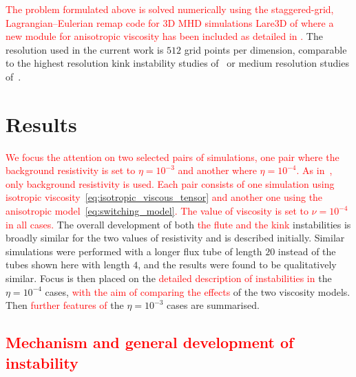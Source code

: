 \documentclass[12pt]{article}
\newcommand{\rs}[2]{\textcolor{red}{#2}}
\begin{document}
\rs{}{The problem formulated above is solved numerically using the
  staggered-grid, Lagrangian–Eulerian remap code for 3D MHD
  simulations Lare3D of \cite{arberStaggeredGridLagrangian2001} where
  a  new module for anisotropic viscosity has been
  included as detailed in \cite{quinnKelvinHelmholtzInstabilityCollapse2021}.} The resolution used in the
current work is  $512$ grid points per dimension, comparable to the
highest resolution kink instability studies
of~\cite{hoodCoronalHeatingMagnetic2009} or medium resolution studies
of~\cite{barefordShockHeatingNumerical2015}. 

\section{Results}
\label{sec-results}

\rs{Two pairs of simulations were performed,}{We focus the attention
on two selected pairs of  
simulations, one pair where the background resistivity is set to
$\eta=10^{-3}$ and another where $\eta=10^{-4}$. As
in~\cite{quinnEffectAnisotropicViscosity2020}, only background
resistivity is used. Each pair consists of one simulation
using isotropic viscosity~\eqref{eq:isotropic_viscous_tensor} and
another one using the \rs{switching}{anisotropic} model~\eqref{eq:switching_model}. The
value of viscosity is set to $\nu = 10^{-4}$ in all cases.} 
%
The overall development of both \rs{}{the flute and the kink}
instabilities is broadly similar for the two values of resistivity and
is described  initially. Similar simulations were performed with a longer flux tube of length $20$ instead of the tubes shown here with length $4$, and the results were found to be qualitatively similar. Focus is 
then placed on the \rs{development of}{detailed description of instabilities in} the
$\eta=10^{-4}$ cases, \rs{comparing the results}{with the aim of comparing the effects} of the two
viscosity models. \rs{These cases illustrate the development of the instabilities while showcasing the effect of the
viscosity models.}{} Then \rs{differences apparent in}{further features of} the $\eta=10^{-3}$
cases are summarised. \rs{without a full exploration of the (qualitatively
similar) results.}{}

\subsection{\rs{Overview of instability development}{Mechanism and
    general development of instability}}
\end{document}
